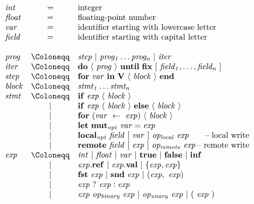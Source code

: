 \documentclass{sokendai_thesis} %
\newcommand{\hsp}[1]{\hspace{-4em}\hbox{#1}}
\begin{document}
\begin{figure}[t]
\normalsize
\[
\begin{array}{lclr}
\mathit{int} & = & \hbox{integer} \\
\mathit{float} & = & \hbox{floating-point number} \\
\mathit{var} & = & \hbox{identifier starting with lowercase letter} \\
\mathit{field} & = & \hbox{identifier starting with capital letter} \\
\\
\mathit{prog}  & \Coloneqq & \mathit{step}~|~\mathit{prog_1}\ldots\mathit{prog_n}~|~\mathit{iter} \\
\mathit{iter} & \Coloneqq & \mathbf{do}~\langle~\mathit{prog}~\rangle~\mathbf{until}~\mathbf{fix}~[~\mathit{field_1},\ldots,\mathit{field_n}~] \\
\mathit{step}& \Coloneqq & \mathbf{for}~\mathit{var}~\mathbf{in}~\mathbf{V}~\langle~\mathit{block}~\rangle~\mathbf{end} \\
\mathit{block} & \Coloneqq & \mathit{stmt_1} \ldots \mathit{stmt_n} \\
\mathit{stmt}  & \Coloneqq & \mathbf{if}~\mathit{exp}~\langle~\mathit{block}~\rangle \\
 & | & \mathbf{if}~\mathit{exp}~\langle~\mathit{block}~\rangle~\mathbf{else}~\langle~\mathit{block}~\rangle \\
 & | & \mathbf{for}~(\mathit{var}~\leftarrow~\mathit{exp})~\langle~\mathit{block}~\rangle \\
 & | & \mathbf{let}~\mathbf{mut}\mathit{_{opt}}~\mathit{var}=\mathit{exp} \\
 & | & \mathbf{local}\mathit{_{opt}}~\mathit{field}~[~\mathit{var}~]~\mathit{op_{local}}~\mathit{exp} & \hsp{-- local write} \\
 & | & \mathbf{remote}~\mathit{field}~[~\mathit{exp}~]~\mathit{op_{remote}}~\mathit{exp} & \hsp{-- remote write} \\
\mathit{exp}   & \Coloneqq & \mathit{int}~|~\mathit{float}~|~\mathit{var}~|~\mathbf{true}~|~\mathbf{false}~|~\mathbf{inf} \\
 & | & \mathit{exp}.\mathbf{ref}~|~\mathit{exp}.\mathbf{val}~|~\{\mathit{exp},\mathit{exp}\} \\
 & | & \mathbf{fst}~\mathit{exp}~|~\mathbf{snd}~\mathit{exp}~|~(\mathit{exp},~\mathit{exp}) \\
 & | & \mathit{exp}~?~\mathit{exp}:\mathit{exp} \\
 & | & \mathit{exp}~\mathit{op_{binary}}~\mathit{exp}~|~\mathit{op_{unary}}~\mathit{exp}~|~(~\mathit{exp}~) \\

\end{array}\]
\end{figure}
\end{document}
